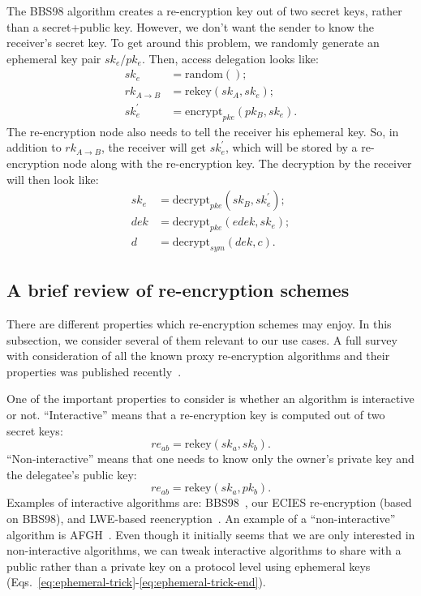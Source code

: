 \documentclass[longbibliography,nofootinbib]{revtex4-1}
\begin{document}
The BBS98 algorithm creates a re-encryption key out of two secret keys, rather than a secret+public key.
However, we don't want the sender to know the receiver's secret key.
To get around this problem, we randomly generate an ephemeral key pair $sk_e/pk_e$.
Then, access delegation looks like:
\begin{align}
    \label{eq:ephemeral-trick}
    sk_e &= \text{random}();\\
    rk_{A\rightarrow B} &= \text{rekey}(sk_A, sk_e);\\
    \label{eq:ephemeral-trick-end}
    sk_e^{\prime} &= \text{encrypt}_{pke}(pk_B, sk_e).
\end{align}
The re-encryption node also needs to tell the receiver his ephemeral key.
So, in addition to $rk_{A\rightarrow B}$, the receiver will get $sk_e^{\prime}$, which will be stored by a re-encryption node along with the re-encryption key.
The decryption by the receiver will then look like:
\begin{align}
    sk_e &= \text{decrypt}_{pke}(sk_B, sk_e^{\prime});\\
    dek &= \text{decrypt}_{pke}(edek, sk_e);\\
    d &= \text{decrypt}_{sym}(dek, c).
\end{align}

\subsection{A brief review of re-encryption schemes}

There are different properties which re-encryption schemes may enjoy.
In this subsection, we consider several of them relevant to our use cases.
A full survey with consideration of all the known proxy re-encryption algorithms and their properties was published recently~\cite{nunez2017proxy}.

One of the important properties to consider is whether an algorithm is interactive or not.
``Interactive'' means that a re-encryption key is computed out of two secret keys:
$$re_{ab} = \text{rekey}(sk_a, sk_b).$$
``Non-interactive'' means that one needs to know only the owner's private key and the delegatee's public key:
$$re_{ab} = \text{rekey}(sk_a, pk_b).$$
Examples of interactive algorithms are: BBS98~\cite{BBS98}, our ECIES re-encryption (based on BBS98), and LWE-based reencryption~\cite{lwe-reencryption}.
An example of a ``non-interactive'' algorithm is AFGH~\cite{AFGH}.
Even though it initially seems that we are only interested in non-interactive algorithms, we can tweak interactive algorithms to share with a public rather than a private key on a protocol
level using ephemeral keys (Eqs.~\ref{eq:ephemeral-trick}-\ref{eq:ephemeral-trick-end}).
\end{document}
